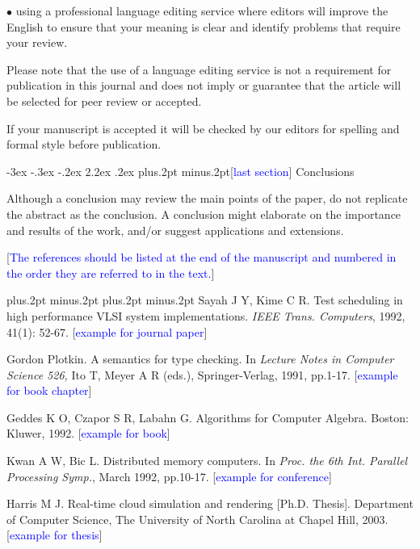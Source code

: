 \documentclass[twoside]{article}
\makeatletter
\def\section{\@startsection{section}{1}{\z@}%
 {-3ex \@plus -.3ex \@minus -.2ex}%
 {2.2ex \@plus.2ex}%
{\normalfont\normalsize\protect\baselineskip=14.5pt plus.2pt minus.2pt\bfseries}}
\makeatother
\begin{document}
\begin{multicols}{2}
$\bullet$ using a professional language editing service where editors will improve the English to ensure that your meaning is clear and  identify problems that require your review.

Please note that the use of a language editing service is not a requirement for publication in this journal and does not imply or guarantee that the article will be selected for peer review or accepted.

If your manuscript is accepted it will be checked by our editors for spelling and formal style before publication.

\section{[\textcolor{blue}{last section}] Conclusions}

Although a conclusion may review the main points of the paper, do not replicate the abstract as the conclusion. A conclusion might elaborate on the importance and results of the work, and/or suggest applications and extensions.

\vspace{2mm}

[\textcolor{blue}{The references should be listed at the end of the manuscript and numbered in the order they are referred to in the text.}]

\begin{thebibliography}{99}
\footnotesize
\itemsep=-3pt plus.2pt minus.2pt
\baselineskip=13pt plus.2pt minus.2pt
Sayah J Y, Kime C R. Test scheduling in high performance VLSI system implementations. {\it IEEE Trans. Computers}, 1992, 41(1): 52-67. [\textcolor{blue}{example for journal paper}]

 Gordon Plotkin. A semantics for type checking. In {\it Lecture Notes in Computer Science 526,} Ito T, Meyer A R (eds.), Springer-Verlag, 1991, pp.1-17. [\textcolor{blue}{example for book chapter}]

 Geddes K O, Czapor S R, Labahn G. Algorithms for Computer Algebra. Boston: Kluwer, 1992. [\textcolor{blue}{example for book}]

 Kwan A W, Bic L. Distributed memory computers. In {\it Proc. the 6th Int. Parallel Processing Symp.}, March 1992, pp.10-17. [\textcolor{blue}{example for conference}]

 Harris M J. Real-time cloud simulation and rendering [Ph.D. Thesis]. Department of Computer Science, The University of North Carolina at Chapel Hill, 2003. [\textcolor{blue}{example for thesis}]


\end{thebibliography}
\end{multicols}
\end{document}
